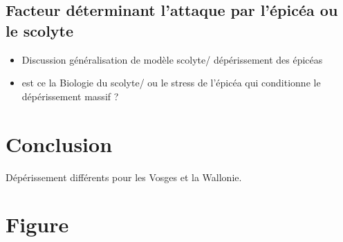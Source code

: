 \documentclass[3p,times]{elsarticle}
\begin{document}
\subsection{Facteur déterminant l'attaque par l'épicéa ou le scolyte}

\begin{itemize}
	\item Discussion généralisation de modèle scolyte/ dépérissement des épicéas
	\item est ce la Biologie du scolyte/ ou le stress de l'épicéa qui conditionne le dépérissement massif ?
	
\end{itemize}

\section{Conclusion}

Dépérissement différents pour les Vosges et la Wallonie.

\section{Figure}
\end{document}
